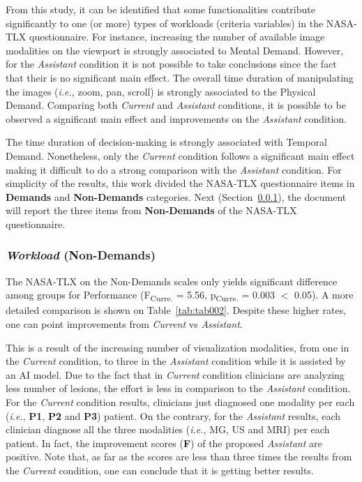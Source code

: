 From this study, it can be identified that some functionalities contribute significantly to one (or more) types of workloads (criteria variables) in the \ac{NASA-TLX} questionnaire.
For instance, increasing the number of available image modalities on the viewport is strongly associated to Mental Demand.
However, for the {\it Assistant} condition it is not possible to take conclusions since the fact that their is no significant main effect.
The overall time duration of manipulating the images ({\it i.e.}, zoom, pan, scroll) is strongly associated to the Physical Demand.
Comparing both {\it Current} and {\it Assistant} conditions, it is possible to be observed a significant main effect and improvements on the {\it Assistant} condition.

The time duration of decision-making is strongly associated with Temporal Demand.
Nonetheless, only the {\it Current} condition follows a significant main effect making it difficult to do a strong comparison with the {\it Assistant} condition.
For simplicity of the results, this work divided the \ac{NASA-TLX} questionnaire items in {\bf Demands} and {\bf Non-Demands} categories.
Next (Section~\ref{sec:sec005006001004}), the document will report the three items from {\bf Non-Demands} of the \ac{NASA-TLX} questionnaire.

\subsubsection{{\it Workload} (Non-Demands)}
\label{sec:sec005006001004}

The \ac{NASA-TLX} on the Non-Demands scales only yields significant difference among groups for Performance (F\textsubscript{Curre.} = 5.56, p\textsubscript{Curre.} = 0.003 $<$ 0.05).
A more detailed comparison is shown on Table~\ref{tab:tab002}.
Despite these higher rates, one can point improvements from {\it Current} vs {\it Assistant}.



This is a result of the increasing number of visualization modalities, from one in the {\it Current} condition, to three in the {\it Assistant} condition while it is assisted by an \ac{AI} model.
Due to the fact that in {\it Current} condition clinicians are analyzing less number of lesions, the effort is less in comparison to the {\it Assistant} condition.
For the {\it Current} condition results, clinicians just diagnosed one modality per each ({\it i.e.}, {\bf P1}, {\bf P2} and {\bf P3}) patient.
On the contrary, for the {\it Assistant} results, each clinician diagnose all the three modalities ({\it i.e.}, \ac{MG}, \ac{US} and \ac{MRI}) per each patient.
In fact, the improvement scores (\textbf{F}) of the proposed {\it Assistant} are positive.
Note that, as far as the scores are less than three times the results from the {\it Current} condition, one can conclude that it is getting better results.

